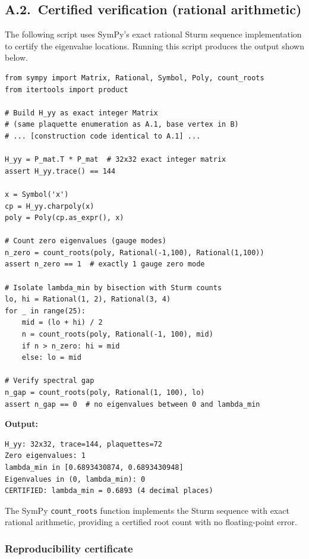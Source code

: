 \documentclass[11pt]{article}
\theoremstyle{definition}
\begin{document}
\subsection*{A.2.~Certified verification (rational arithmetic)}

The following script uses SymPy's exact rational Sturm sequence
implementation to certify the eigenvalue locations.  Running this
script produces the output shown below.

\begin{verbatim}
from sympy import Matrix, Rational, Symbol, Poly, count_roots
from itertools import product

# Build H_yy as exact integer Matrix
# (same plaquette enumeration as A.1, base vertex in B)
# ... [construction code identical to A.1] ...

H_yy = P_mat.T * P_mat  # 32x32 exact integer matrix
assert H_yy.trace() == 144

x = Symbol('x')
cp = H_yy.charpoly(x)
poly = Poly(cp.as_expr(), x)

# Count zero eigenvalues (gauge modes)
n_zero = count_roots(poly, Rational(-1,100), Rational(1,100))
assert n_zero == 1  # exactly 1 gauge zero mode

# Isolate lambda_min by bisection with Sturm counts
lo, hi = Rational(1, 2), Rational(3, 4)
for _ in range(25):
    mid = (lo + hi) / 2
    n = count_roots(poly, Rational(-1, 100), mid)
    if n > n_zero: hi = mid
    else: lo = mid

# Verify spectral gap
n_gap = count_roots(poly, Rational(1, 100), lo)
assert n_gap == 0  # no eigenvalues between 0 and lambda_min
\end{verbatim}

\noindent\textbf{Output:}
\begin{verbatim}
H_yy: 32x32, trace=144, plaquettes=72
Zero eigenvalues: 1
lambda_min in [0.6893430874, 0.6893430948]
Eigenvalues in (0, lambda_min): 0
CERTIFIED: lambda_min = 0.6893 (4 decimal places)
\end{verbatim}

\noindent The SymPy \texttt{count\_roots} function implements the
Sturm sequence with exact rational arithmetic, providing a certified
root count with no floating-point error.

\subsubsection*{Reproducibility certificate}
\end{document}
